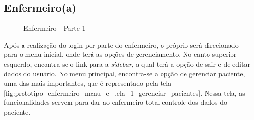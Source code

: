 \subsection{Enfermeiro(a)}
\begin{figure}[H]
    \centering
\end{figure}

\begin{figure}[H]
    \centering
    \caption{Enfermeiro - Parte 1}
\end{figure}

Após a realização do login por parte do enfermeiro, o próprio será direcionado para o menu inicial, onde terá as opções de gerenciamento. No canto superior esquerdo, encontra-se o link para a \textit{sidebar}, a qual terá a opção de sair e de editar dados do usuário. No menu principal, encontra-se a opção de gerenciar paciente, uma das mais importantes, que é representado pela tela \ref{fig:prototipo_enfermeiro_menu_e_tela_1_gerenciar_pacientes}. Nessa tela, as funcionalidades servem para dar ao enfermeiro total controle dos dados do paciente. 

